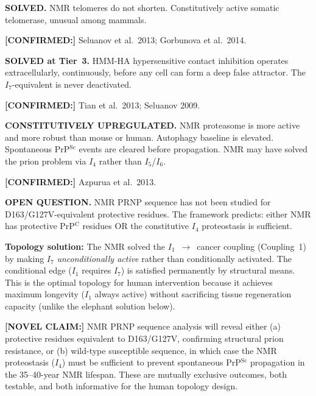 \documentclass[12pt,a4paper]{article}
\newcommand{\prpc}{PrP$^{\mathrm{C}}$}
\newcommand{\prpsc}{PrP$^{\mathrm{Sc}}$}
\newcommand{\novel}[1]{\noindent\colorbox{yellow!18}{\parbox{\dimexpr\linewidth-2\fboxsep}{%
  \textbf{[NOVEL CLAIM:]} #1}}\vspace{0.4em}}
\newcommand{\confirmed}[1]{\noindent\colorbox{green!10}{\parbox{\dimexpr\linewidth-2\fboxsep}{%
  \textbf{[CONFIRMED:]} #1}}\vspace{0.4em}}
\newcommand{\Inet}[1]{$I_{#1}$}
\begin{document}
\begin{description}[leftmargin=2em]
  \item[\Inet{1} (telomere):] \textbf{SOLVED.} NMR telomeres do not shorten.
    Constitutively active somatic telomerase, unusual among mammals.
    
    \confirmed{Seluanov et al.\ 2013; Gorbunova et al.\ 2014.}

  \item[\Inet{7} (cancer surveillance):] \textbf{SOLVED at Tier~3.} HMM-HA
    hypersensitive contact inhibition operates extracellularly, continuously,
    before any cell can form a deep false attractor. The \Inet{7}-equivalent
    is never deactivated.
    
    \confirmed{Tian et al.\ 2013; Seluanov 2009.}

  \item[\Inet{4} (proteostasis):] \textbf{CONSTITUTIVELY UPREGULATED.}
    NMR proteasome is more active and more robust than mouse or human.
    Autophagy baseline is elevated. Spontaneous \prpsc{} events are cleared
    before propagation. NMR may have solved the prion problem via \Inet{4}
    rather than \Inet{5}/\Inet{6}.
    
    \confirmed{Azpurua et al.\ 2013.}

  \item[\Inet{5}/\Inet{6} (prion sequence):] \textbf{OPEN QUESTION.}
    NMR PRNP sequence has not been studied for D163/G127V-equivalent
    protective residues. The framework predicts: either NMR has protective
    \prpc{} residues OR the constitutive \Inet{4} proteostasis is sufficient.
\end{description}

\textbf{Topology solution:} The NMR solved the \Inet{1}~$\to$~cancer coupling
(Coupling~1) by making \Inet{7} \textit{unconditionally active} rather than
conditionally activated. The conditional edge (\Inet{1} requires \Inet{7})
is satisfied permanently by structural means. This is the optimal topology
for human intervention because it achieves maximum longevity (\Inet{1} always
active) without sacrificing tissue regeneration capacity (unlike the elephant
solution below).

\novel{NMR PRNP sequence analysis will reveal either (a) protective residues
equivalent to D163/G127V, confirming structural prion resistance, or (b)
wild-type susceptible sequence, in which case the NMR proteostasis (\Inet{4})
must be sufficient to prevent spontaneous \prpsc{} propagation in the
35--40-year NMR lifespan. These are mutually exclusive outcomes, both
testable, and both informative for the human topology design.}
\end{document}
